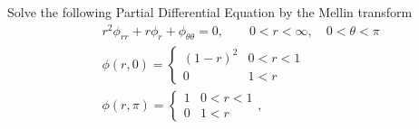 \begin{problem}{4}
  Solve the following Partial Differential Equation by the Mellin transform
  \begin{align*}
    &r^{2} \phi_{rr} + r \phi_r + \phi_{\theta \theta} = 0, \qquad 0 < r < \infty, \quad 0 < \theta < \pi \\
    &\phi(r, 0) =
    \begin{cases}
      (1-r)^2 & 0 < r < 1 \\
      0 & 1 < r
    \end{cases}\\
    &\phi(r, \pi) =
    \begin{cases}
      1 & 0 < r < 1 \\
      0 & 1 < r
    \end{cases},
  \end{align*}
\end{problem}


